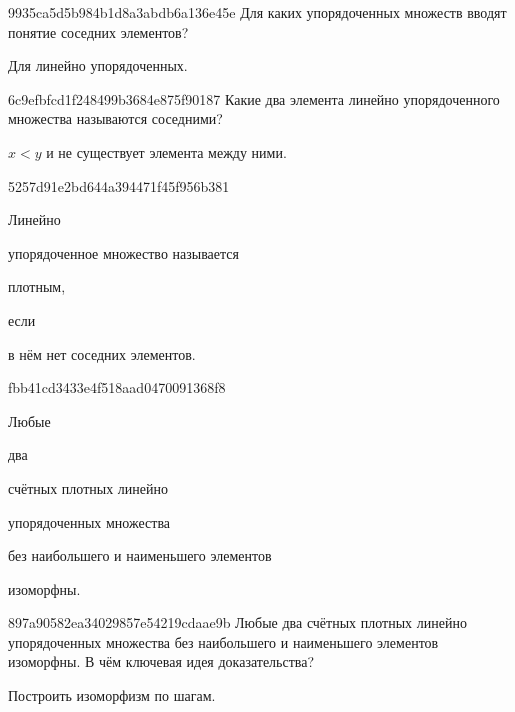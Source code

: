 \begin{note}{9935ca5d5b984b1d8a3abdb6a136e45e}
    Для каких упорядоченных множеств вводят понятие соседних элементов?

    \begin{cloze}{1}
        Для линейно упорядоченных.
    \end{cloze}
\end{note}

\begin{note}{6c9efbfcd1f248499b3684e875f90187}
    Какие два элемента линейно упорядоченного множества называются соседними?

    \begin{cloze}{1}
        \({ x < y }\) и не существует элемента между ними.
    \end{cloze}
\end{note}

\begin{note}{5257d91e2bd644a394471f45f956b381}
    \begin{icloze}{3}Линейно\end{icloze} упорядоченное множество называется \begin{icloze}{2}плотным,\end{icloze} если \begin{icloze}{1}в нём нет соседних элементов.\end{icloze}
\end{note}

\begin{note}{fbb41cd3433e4f518aad0470091368f8}
    \begin{icloze}{4}Любые\end{icloze} два \begin{icloze}{3}счётных плотных линейно\end{icloze} упорядоченных множества \begin{icloze}{2}без наибольшего и наименьшего элементов\end{icloze} \begin{icloze}{1}изоморфны.\end{icloze}
\end{note}

\begin{note}{897a90582ea34029857e54219cdaae9b}
    Любые два счётных плотных линейно упорядоченных множества без наибольшего и наименьшего элементов изоморфны.
    В чём ключевая идея доказательства?

    \begin{cloze}{1}
        Построить изоморфизм по шагам.
    \end{cloze}
\end{note}

